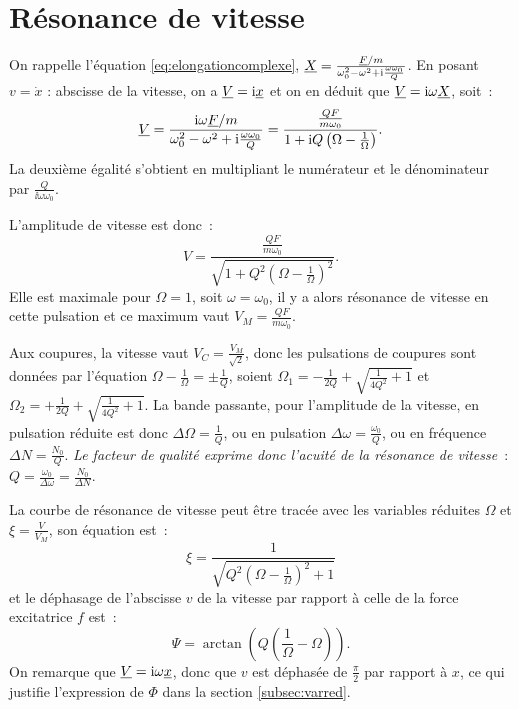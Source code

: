 \section{Résonance de vitesse}

On rappelle l'équation \eqref{eq:elongationcomplexe}, \(\underline{X} =
\frac{\underline{F}/m}{\omega_0^2-\omega^2+\mathrm{i}\frac{\omega\omega_0}{Q}}\). En posant \(v =
\dot{x}\) : abscisse de la vitesse, on a \(\underline{V} = \mathrm{i} \underline{x}\) et on en déduit que
\(\underline{V} = \mathrm{i}\omega \underline{X}\), soit~:
\begin{equation}
  \underline{V} = \frac{\mathrm{i}\omega \underline{F}/m}{\omega_0^2-\omega^2+\mathrm{i}\frac{\omega\omega_0}{Q}}
  = \frac{\frac{QF}{m\omega_0}}{1+\mathrm{i} Q\left(\Omega-\frac{1}{\Omega}\right)}.
\end{equation}
La deuxième égalité s'obtient en multipliant le numérateur et le dénominateur
par \(\frac{Q}{\ii\omega\omega_0}\).

L'amplitude de vitesse est donc~:
\begin{equation}
  V =
  \frac{\frac{QF}{m\omega_0}}{\sqrt{1+Q^2\left(\Omega-\frac{1}{\Omega}\right)^2}}.
\end{equation}
Elle est maximale pour \(\Omega = 1\), soit \(\omega = \omega_0\), il y a alors
résonance de vitesse en cette pulsation et ce maximum vaut \(V_M =
\frac{QF}{m\omega_0}\).

Aux coupures, la vitesse vaut \(V_C = \frac{V_M}{\sqrt{2}}\), donc les
pulsations de coupures sont données par l'équation \(\Omega - \frac{1}{\Omega} =
\pm \frac{1}{Q}\), soient \(\Omega_1 = -\frac{1}{2Q} + \sqrt{\frac{1}{4Q^2}+1}\)
et \(\Omega_2 = +\frac{1}{2Q} + \sqrt{\frac{1}{4Q^2}+1}\). La bande passante,
pour l'amplitude de la vitesse, en pulsation réduite est donc \(\Delta\Omega =
\frac{1}{Q}\), ou en pulsation \(\Delta\omega = \frac{\omega_0}{Q}\), ou en
fréquence \(\Delta N = \frac{N_0}{Q}\). \emph{Le facteur de qualité exprime donc
l'acuité de la résonance de vitesse}~: \(Q = \frac{\omega_0}{\Delta\omega} =
\frac{N_0}{\Delta N}\).

La courbe de résonance de vitesse peut être tracée avec les variables réduites
\(\Omega\) et \(\xi = \frac{V}{V_M}\), son équation est~:
\begin{equation}
  \xi = \frac{1}{\sqrt{Q^2\left(\Omega - \frac{1}{\Omega}\right)^2 + 1}}
\end{equation}
et le déphasage de l'abscisse \(v\) de la vitesse par rapport à celle de la
force excitatrice \(f\) est~:
\begin{equation}
  \Psi = \arctan\left(Q\left(\frac{1}{\Omega} - \Omega\right)\right).
\end{equation}
On remarque que \(\underline{V} = \mathrm{i}\omega \underline{x}\), donc que \(v\) est déphasée de
\(\frac{\pi}{2}\) par rapport à \(x\), ce qui justifie l'expression de \(\Phi\)
dans la section \ref{subsec:varred}.

